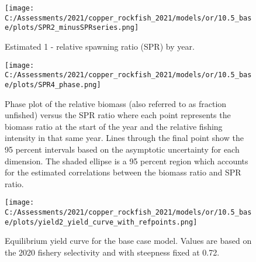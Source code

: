 \documentclass[11pt,
  english,
  a4paper,
]{article}
\begin{document}
\tagmcend\tagstructend

\clearpage


\begin{figure}
\centering
\texttt{[image: C:/Assessments/2021/copper\_rockfish\_2021/models/or/10.5\_base/plots/SPR2\_minusSPRseries.png]}
\caption{Estimated 1 - relative spawning ratio (SPR) by year.\label{fig:1-spr}}
\end{figure}

\tagmcend\tagstructend

\clearpage


\begin{figure}
\centering
\texttt{[image: C:/Assessments/2021/copper\_rockfish\_2021/models/or/10.5\_base/plots/SPR4\_phase.png]}
\caption{Phase plot of the relative biomass (also referred to as fraction unfished) versus the SPR ratio where each point represents the biomass ratio at the start of the year and the relative fishing intensity in that same year. Lines through the final point show the 95 percent intervals based on the asymptotic uncertainty for each dimension. The shaded ellipse is a 95 percent region which accounts for the estimated correlations between the biomass ratio and SPR ratio.\label{fig:phase}}
\end{figure}

\tagmcend\tagstructend

\clearpage


\begin{figure}
\centering
\texttt{[image: C:/Assessments/2021/copper\_rockfish\_2021/models/or/10.5\_base/plots/yield2\_yield\_curve\_with\_refpoints.png]}
\caption{Equilibrium yield curve for the base case model. Values are based on the 2020 fishery selectivity and with steepness fixed at 0.72.\label{fig:yield}}
\end{figure}
\end{document}
